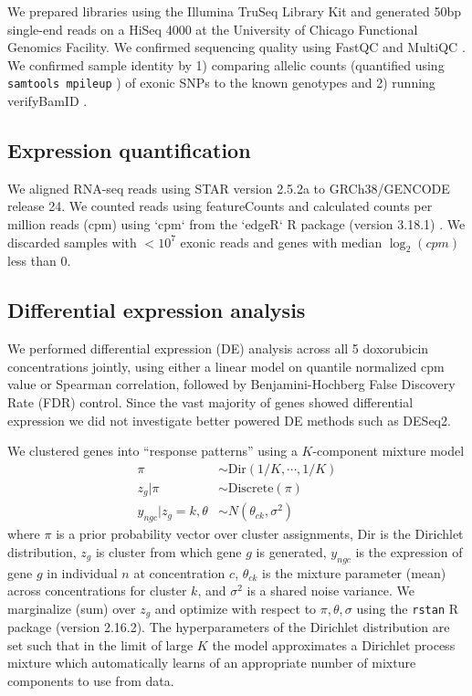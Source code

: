 \documentclass[9pt,lineno]{elife}
\begin{document}
We prepared libraries using the Illumina TruSeq Library Kit and
generated 50bp single-end reads on a HiSeq 4000 at the University of
Chicago Functional Genomics Facility. 
We confirmed sequencing quality using FastQC and MultiQC
 \citep{Ewels2016}. We confirmed sample identity by 1) comparing
allelic counts (quantified using \texttt{samtools mpileup} \citep{li2009sequence}) of exonic SNPs to the known genotypes and 2) running
verifyBamID  \citep{Jun2012}.

\subsection*{Expression quantification}

We aligned RNA-seq reads using STAR version 2.5.2a \citep{Dobin2013} to GRCh38/GENCODE release 24. We counted reads using featureCounts \citep{Liao2014} and calculated counts per million reads (cpm) using `cpm` from the `edgeR` R package (version 3.18.1) \citep{Robinson2010}. We discarded samples with $<10^7$ exonic reads and genes with median $\log_2(cpm)$ less than $0$.

\subsection*{Differential expression analysis} 

We performed differential expression (DE) analysis across all 5 doxorubicin concentrations jointly, using either a linear model on quantile normalized cpm value or Spearman correlation, followed by Benjamini-Hochberg False Discovery Rate (FDR) control. Since the vast majority of genes showed differential expression we did not investigate better powered DE methods such as DESeq2. 

We clustered genes into ``response patterns'' using a $K$-component mixture model 
\begin{align}
\pi &\sim \text{Dir}(1/K,\cdots,1/K) \nonumber \\ 
z_g | \pi &\sim \text{Discrete}(\pi) \nonumber \\
y_{ngc} | z_g=k, \theta &\sim N( \theta_{ck}, \sigma^2 )
\label{eq:mixture}
\end{align}
where $\pi$ is a prior probability vector over cluster assignments, Dir is the Dirichlet distribution, $z_g$ is cluster from which gene $g$ is generated, $y_{ngc}$ is the expression of gene $g$ in individual $n$ at concentration $c$, $\theta_{ck}$ is the mixture parameter (mean) across concentrations for cluster $k$, and $\sigma^2$ is a shared noise variance. 
We marginalize (sum) over $z_g$ and optimize with respect to $\pi, \theta, \sigma$ using the \texttt{rstan} R package \citep{carpenter2016stan} (version 2.16.2). 
The hyperparameters of the Dirichlet distribution are set such that in the limit of large $K$ the model approximates a Dirichlet process mixture \citep{maceachern1998estimating} which automatically learns of an appropriate number of mixture components to use from data. 
\end{document}

